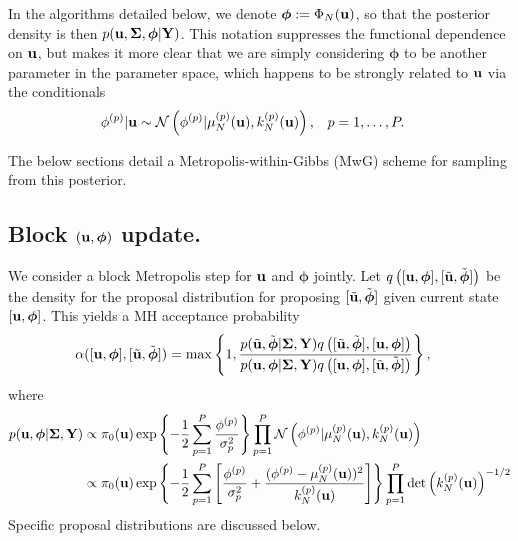 \documentclass[12pt]{article}
\newcommand{\bphi}{\boldsymbol{\phi}}
\begin{document}
In the algorithms detailed below, we denote $\bphi := \indexDesign[\Ndesign]{\SSR}(\bpar)$, so that the posterior density is then $p(\bpar, \CovObs, \bphi | \stateMat)$. This notation suppresses 
the functional dependence on $\mathbf{u}$, but makes it more clear that we are simply considering $\bphi$ to be another parameter in the parameter space, which happens to be strongly 
related to $\mathbf{u}$ via the conditionals
\begin{align*}
&{\phi}^{(p)} | \mathbf{u} \sim \mathcal{N}\left({\phi}^{(p)} | \mu_{N}^{(p)}(\mathbf{u}), k_{N}^{(p)}(\mathbf{u}) \right), &&p = 1, \dots, P.
\end{align*}

The below sections detail a Metropolis-within-Gibbs (MwG) scheme for sampling from this posterior. 

\subsection{Block $(\bpar, \bphi)$ update.}
We consider a block Metropolis step for $\mathbf{u}$ and $\bphi$ jointly. Let $\propDens\left([\bpar, \bphi], [\tilde{\bpar}, \tilde{\bphi}] \right)$ be the density for the proposal distribution for 
proposing $[\tilde{\bpar}, \tilde{\bphi}]$ given current state $[\bpar, \bphi]$. This yields a MH acceptance probability
\begin{align*}
\accProbMH([\bpar, \bphi], [\tilde{\bpar}, \tilde{\bphi}]) 
&= \max\left\{1,  \frac{p(\tilde{\bpar}, \tilde{\bphi}|\CovObs, \stateMat)\propDens\left([\tilde{\bpar}, \tilde{\bphi}], [\bpar, \bphi] \right)}{p(\bpar, \bphi|\CovObs, \stateMat) \propDens\left([\bpar, \bphi], [\tilde{\bpar}, \tilde{\bphi}] \right)} \right\},
\end{align*}
where 
\begin{align*}
p(\bpar, \bphi|\CovObs, \stateMat) 
&\propto \priorDens(\bpar) \exp\left\{-\frac{1}{2} \sum_{\objIdx=1}^{\Nobj} \frac{\indexObj{\phi}}{\sdObs^2_{\objIdx}} \right\} 
 \prod_{\objIdx=1}^{\Nobj} \Gaussian\left(\indexObj{\phi} | \GPMeanPredOut{\Ndesign}{\objIdx}(\bpar), \GPKerPredOut{\Ndesign}{\objIdx}(\bpar)\right) \\
&\propto \priorDens(\bpar) \exp\left\{-\frac{1}{2} \sum_{\objIdx=1}^{\Nobj} \left[\frac{\indexObj{\phi}}{\sdObs^2_{\objIdx}} + \frac{(\indexObj{\phi} - \GPMeanPredOut{\Ndesign}{\objIdx}(\bpar))^2}{\GPKerPredOut{\Ndesign}{\objIdx}(\bpar)} \right]  \right\}
	\prod_{\objIdx=1}^{\Nobj} \det\left(\GPKerPredOut{\Ndesign}{\objIdx}(\bpar)\right)^{-1/2}
\end{align*}
Specific proposal distributions are discussed below. 
\end{document}

